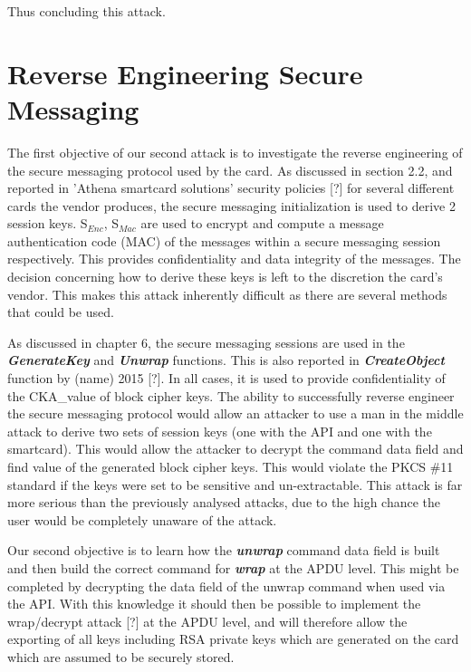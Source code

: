\documentclass[bsc,frontabs,twoside,singlespacing,parskip,deptreport]{infthesis}     %
\begin{document}
Thus concluding this attack.


\section{Reverse Engineering Secure Messaging}

The first objective of our second attack is to investigate the reverse engineering of the secure messaging protocol used by the card. As discussed in section 2.2, and reported in 'Athena smartcard solutions' security policies [?] for several different cards the vendor produces, the secure messaging initialization is used to derive 2 session keys. S$_{Enc}$, S$_{Mac}$ are used to encrypt and compute a message authentication code (MAC) of the messages within a secure messaging session respectively. This provides confidentiality and data integrity of the messages. The decision concerning how to derive these keys is left to the discretion the card's vendor. This makes this attack inherently difficult as there are several methods that could be used.

As discussed in chapter 6, the secure messaging sessions are used in the \textbf{\textit{GenerateKey}} and \textbf{\textit{Unwrap}} functions. This is also reported in \textbf{\textit{CreateObject}} function by (name) 2015 [?]. In all cases, it is used to provide confidentiality of the CKA\_value of block cipher keys. The ability to successfully reverse engineer the secure messaging protocol would allow an attacker to use a man in the middle attack to derive two sets of session keys (one with the API and one with the smartcard). This would allow the attacker to decrypt the command data field and find value of the generated block cipher keys. This would violate the PKCS \#11 standard if the keys were set to be sensitive and un-extractable. This attack is far more serious than the previously analysed attacks, due to the high chance the user would be completely unaware of the attack.

Our second objective is to learn how the \textbf{\textit{unwrap}} command data field is built and then build the correct command for \textbf{\textit{wrap}} at the APDU level. This might be completed by decrypting the data field of the unwrap command when used via the API. With this knowledge it should then be possible to implement the wrap/decrypt attack [?] at the APDU level, and will therefore allow the exporting of all keys including RSA private keys which are generated on the card which are assumed to be securely stored.
\end{document}
